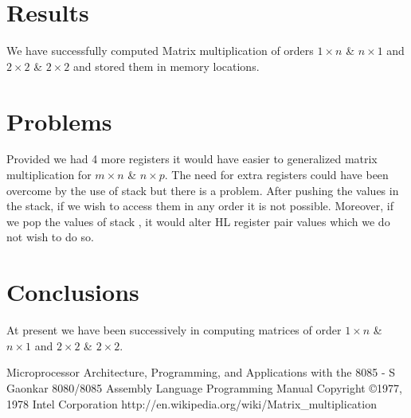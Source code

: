 \documentclass[12pt]{article}
\begin{document}
\section{Results}\label{results}
We have successfully computed Matrix multiplication of orders $1 \times n$ \& $n \times 1$ and $2 \times 2$ \& $2 \times 2$ and stored them in memory locations.

\section{Problems}
Provided we had 4 more registers it would have easier to generalized matrix multiplication for  $m \times n$ \& $n \times p$. The need for extra registers could have been overcome by the use of stack but there is a problem. After pushing the values in the stack, if we wish to access them in any order it is not possible. Moreover, if we pop the values of stack , it would alter HL register pair values which we do not wish to do so.

\section{Conclusions}\label{conclusions}
At present we have been successively in computing matrices of order $1 \times n$ \& $n \times 1$ and $2 \times 2$ \& $2 \times 2$.

\begin{thebibliography}{9}
 Microprocessor Architecture, Programming, and Applications with the 8085 - S Gaonkar
 8080/8085 Assembly Language Programming Manual Copyright \copyright 1977, 1978 Intel Corporation
 http://en.wikipedia.org/wiki/Matrix\_multiplication
\end{thebibliography}
\end{document}
